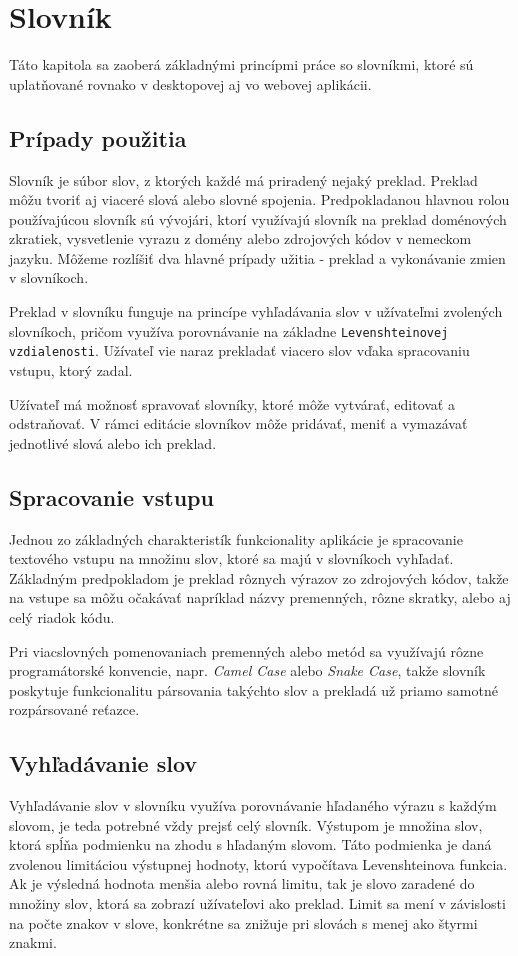 \documentclass[
  digital, %
  table,   %
  lof,     %
  lot,     %
]{fithesis3}
\begin{document}
\chapter{Slovník}
Táto kapitola sa zaoberá základnými princípmi práce so slovníkmi, ktoré sú uplatňované rovnako v desktopovej aj vo webovej aplikácii.

\section{Prípady použitia}
Slovník je súbor slov, z ktorých každé má priradený nejaký preklad. Preklad môžu tvoriť aj viaceré slová alebo slovné spojenia. Predpokladanou hlavnou rolou používajúcou slovník sú vývojári, ktorí využívajú slovník na preklad doménových zkratiek, vysvetlenie vyrazu z domény alebo zdrojových kódov v nemeckom jazyku. Môžeme rozlíšiť dva hlavné prípady užitia - preklad a vykonávanie zmien v slovníkoch.

Preklad v slovníku funguje na princípe vyhľadávania slov v užívateľmi zvolených slovníkoch, pričom využíva porovnávanie na základne \texttt{Levenshteinovej vzdialenosti}. Užívateľ vie naraz prekladať viacero slov vďaka spracovaniu vstupu, ktorý zadal.

Užívateľ má možnosť spravovať slovníky, ktoré môže vytvárať, editovať a odstraňovať. V rámci editácie slovníkov môže pridávať, meniť a vymazávať jednotlivé slová alebo ich preklad.

\section{Spracovanie vstupu}
Jednou zo základných charakteristík funkcionality aplikácie je spracovanie textového vstupu na množinu slov, ktoré sa majú v slovníkoch vyhľadať. Základným predpokladom je preklad rôznych výrazov zo zdrojových kódov, takže na vstupe sa môžu očakávať napríklad názvy premenných, rôzne skratky, alebo aj celý riadok kódu.

Pri viacslovných pomenovaniach premenných alebo metód sa využívajú rôzne programátorské konvencie, napr. \textit{Camel Case} alebo \textit{Snake Case}, takže slovník poskytuje funkcionalitu pársovania takýchto slov a prekladá už priamo samotné rozpársované reťazce.

\section{Vyhľadávanie slov}
Vyhľadávanie slov v slovníku využíva porovnávanie hľadaného výrazu s každým slovom, je teda potrebné vždy prejsť celý slovník. Výstupom je množina slov, ktorá spĺňa podmienku na zhodu s hľadaným slovom. Táto podmienka je daná zvolenou limitáciou výstupnej hodnoty, ktorú vypočítava Levenshteinova funkcia. Ak je výsledná hodnota menšia alebo rovná limitu, tak je slovo zaradené do množiny slov, ktorá sa zobrazí užívateľovi ako preklad. Limit sa mení v závislosti na počte znakov v slove, konkrétne sa znižuje pri slovách s menej ako štyrmi znakmi.
\end{document}

